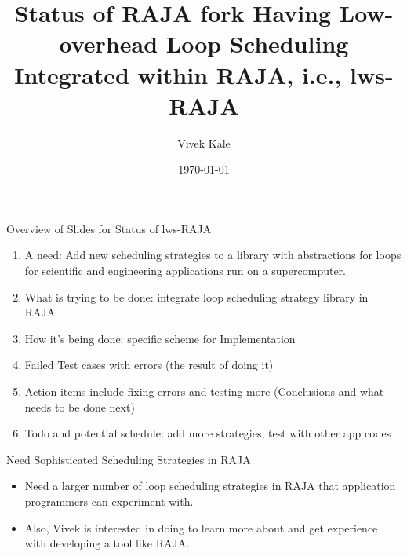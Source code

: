 \documentclass{beamer}
\title{Status of RAJA fork Having Low-overhead Loop Scheduling Integrated within RAJA, i.e., lws-RAJA}
\author{Vivek Kale}
\date{\today}
\begin{document}
 

\begin{frame}
\titlepage
\end{frame}

\begin{frame}[label=ovwlwsRAJAstatus]{Overview of Slides for Status of lws-RAJA}
\begin{enumerate} 
\item A need: Add new scheduling strategies to a library with abstractions for loops for scientific and engineering applications run on a supercomputer.
\item What is trying to be done: integrate loop scheduling strategy library in RAJA 
\item How it's being done: specific scheme for Implementation 
\item Failed Test cases with errors (the result of doing it) 
\item Action items include fixing errors and testing more (Conclusions and what needs to be done next)
\item Todo and potential schedule: add more strategies, test with other app codes
\end{enumerate}
\end{frame}

\begin{frame}{Need Sophisticated Scheduling Strategies in RAJA}
\begin{itemize}
\item Need a larger number of loop scheduling strategies in RAJA that application programmers can experiment with.
\item Also, Vivek is interested in doing to learn more about and get experience with developing a tool like RAJA. 
\end{itemize} 
\end{frame}

\end{document}
